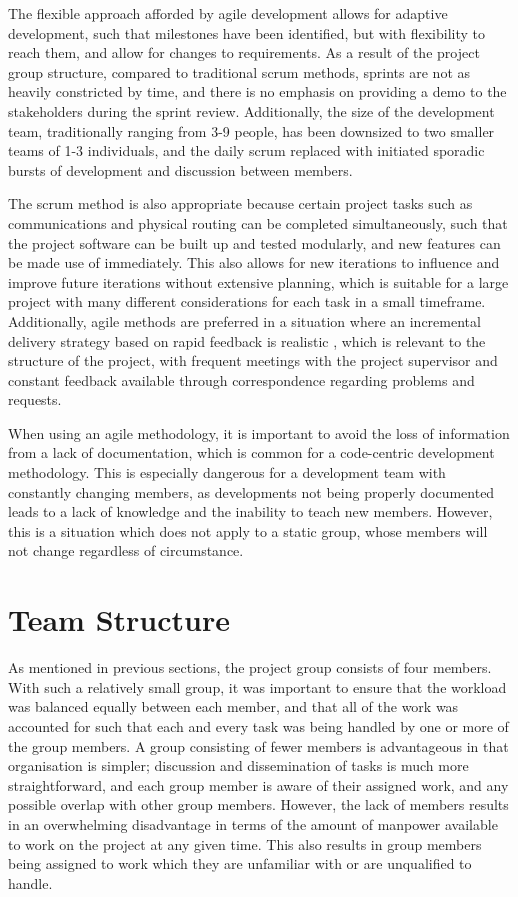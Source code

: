 The flexible approach afforded by agile development allows for adaptive development, such that milestones have been identified, but with flexibility to reach them, and allow for changes to requirements. As a result of the project group structure, compared to traditional scrum methods, sprints are not as heavily constricted by time, and there is no emphasis on providing a demo to the stakeholders during the sprint review. Additionally, the size of the development team, traditionally ranging from 3-9 people, has been downsized to two smaller teams of 1-3 individuals, and the daily scrum replaced with initiated sporadic bursts of development and discussion between members.

The scrum method is also appropriate because certain project tasks such as communications and physical routing can be completed simultaneously, such that the project software can be built up and tested modularly, and new features can be made use of immediately. This also allows for new iterations to influence and improve future iterations without extensive planning, which is suitable for a large project with many different considerations for each task in a small timeframe. Additionally, agile methods are preferred in a situation where an incremental delivery strategy based on rapid feedback is realistic \cite{iansommerville2010}, which is relevant to the structure of the project, with frequent meetings with the project supervisor and constant feedback available through correspondence regarding problems and requests.

When using an agile methodology, it is important to avoid the loss of information from a lack of documentation, which is common for a code-centric development methodology. This is especially dangerous for a development team with constantly changing members, as developments not being properly documented leads to a lack of knowledge and the inability to teach new members. However, this is a situation which does not apply to a static group, whose members will not change regardless of circumstance. 

\section{Team Structure}
As mentioned in previous sections, the project group consists of four members. With such a relatively small group, it was important to ensure that the workload was balanced equally between each member, and that all of the work was accounted for such that each and every task was being handled by one or more of the group members. A group consisting of fewer members is advantageous in that organisation is simpler; discussion and dissemination of tasks is much more straightforward, and each group member is aware of their assigned work, and any possible overlap with other group members. However, the lack of members results in an overwhelming disadvantage in terms of the amount of manpower available to work on the project at any given time. This also results in group members being assigned to work which they are unfamiliar with or are unqualified to handle.

